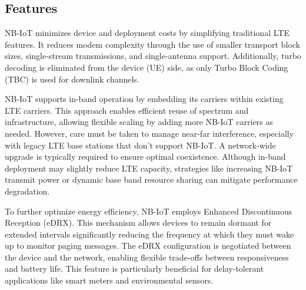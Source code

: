 \subsection{Features}
NB-IoT minimizes device and deployment costs by simplifying traditional LTE features. 
It reduces modem complexity through the use of smaller transport block sizes, single-stream transmissions, and single-antenna support. 
Additionally, turbo decoding is eliminated from the device (UE) side, as only Turbo Block Coding (TBC) is used for downlink channels. 

NB-IoT supports in-band operation by embedding its carriers within existing LTE carriers. 
This approach enables efficient reuse of spectrum and infrastructure, allowing flexible scaling by adding more NB-IoT carriers as needed. 
However, care must be taken to manage near-far interference, especially with legacy LTE base stations that don't support NB-IoT. 
A network-wide upgrade is typically required to ensure optimal coexistence. 
Although in-band deployment may slightly reduce LTE capacity, strategies like increasing NB-IoT transmit power or dynamic base band resource sharing can mitigate performance degradation.

To further optimize energy efficiency, NB-IoT employs Enhanced Discontinuous Reception (eDRX). 
This mechanism allows devices to remain dormant for extended intervals significantly reducing the frequency at which they must wake up to monitor paging messages. 
The eDRX configuration is negotiated between the device and the network, enabling flexible trade-offs between responsiveness and battery life. 
This feature is particularly beneficial for delay-tolerant applications like smart meters and environmental sensors.